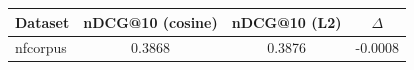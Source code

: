 \begin{tabular}{lccc}
\toprule
Dataset & nDCG@10 (cosine) & nDCG@10 (L2) & $\Delta$ \\
\midrule
nfcorpus & 0.3868 & 0.3876 & -0.0008 \\
\bottomrule
\end{tabular}
